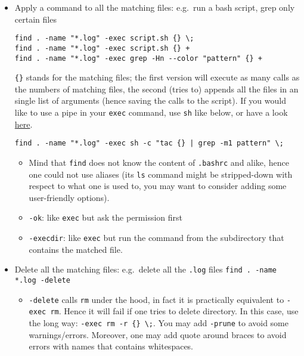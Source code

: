 \documentclass[a4paper,12pt,%
              final%
              ]{article}
\begin{document}
\begin{itemize}
  \item Apply a command to all the matching files: e.g.~run a bash script, grep only certain files
\begin{verbatim}
find . -name "*.log" -exec script.sh {} \;
find . -name "*.log" -exec script.sh {} +
find . -name "*.log" -exec grep -Hn --color "pattern" {} +
\end{verbatim}
    \verb|{}| stands for the matching files; the first version will execute as many calls as the numbers of matching files, the second (tries to) appends all the files in an single list of arguments (hence saving the calls to the script). If you would like to use a pipe in your \texttt{exec} command, use \texttt{sh} like below, or have a look \href{https://stackoverflow.com/questions/307015/how-do-i-include-a-pipe-in-my-linux-find-exec-command}{here}.
\begin{verbatim}
find . -name "*.log" -exec sh -c "tac {} | grep -m1 pattern" \;
\end{verbatim}
  \begin{itemize}
    \item Mind that \texttt{find} does not know the content of \texttt{.bashrc} and alike, hence one could not use aliases (its \texttt{ls} command might be stripped-down with respect to what one is used to, you may want to consider adding some user-friendly options).
  \end{itemize}
  \begin{itemize}
    \item \verb|-ok|: like \texttt{exec} but ask the permission first
    \item \verb|-execdir|: like \texttt{exec} but run the command from the subdirectory that contains the matched file.
  \end{itemize}
  \item Delete all the matching files: e.g.~delete all the \texttt{.log} files \texttt{find . -name *.log -delete}
    \begin{itemize}
      \item \texttt{-delete} calls \texttt{rm} under the hood, in fact it is practically equivalent to \texttt{-exec rm}. Hence it will fail if one tries to delete directory. In this case, use the long way: \verb|-exec rm -r {} \;|. You may add \verb|-prune| to avoid some warnings/errors. Moreover, one may add quote around braces to avoid errors with names that contains whitespaces.
    \end{itemize}
\end{itemize}
\end{document}
